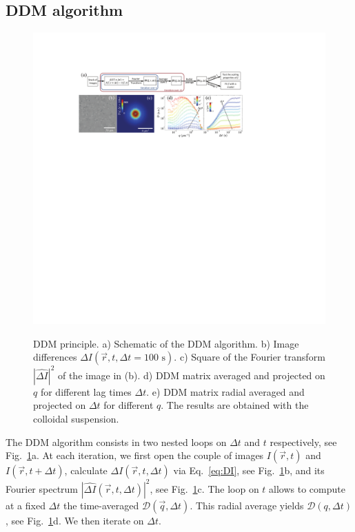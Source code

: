 \documentclass[prb,twocolumn,amsmath,amssymb]{revtex4-1}
\begin{document}
\subsection{DDM algorithm}
\label{sec:ddmalgo}

\begin{figure}
	\includegraphics[width=\linewidth]{Graph.pdf}\\
	\caption{DDM principle. a) Schematic of the DDM algorithm. b) Image differences $\Delta I(\vec{r}, t,\Delta t=100 \text{ s})$. c) Square of the Fourier transform $|\widehat{\Delta I}|^2$ of the image in  (b). d) DDM matrix averaged and projected on $q$ for different lag times $\Delta t$. e) DDM matrix radial averaged and projected on $\Delta t$ for different $q$.  The results are obtained with the colloidal suspension.}
	\label{fig:D}
\end{figure}

The DDM algorithm consists in two nested loops on $\Delta t$ and $t$ respectively, see Fig.~\ref{fig:D}a. At each iteration, we first open the couple of images $I(\vec{r},t)$ and $I(\vec{r},t+\Delta t)$, calculate $\Delta I(\vec{r},t, \Delta t)$ via Eq.~\eqref{eq:DI}, see Fig.~\ref{fig:D}b, and its Fourier spectrum $\left|\widehat{\Delta I}(\vec{r},t, \Delta t)\right|^2$, see Fig.~\ref{fig:D}c.  The loop on $t$ allows to compute at a fixed $\Delta t$ the time-averaged $\mathcal{D}(\vec{q}, \Delta t)$. This radial average yields $\mathcal{D}(q, \Delta t)$, see Fig.~\ref{fig:D}d. We then iterate on $\Delta t$.
\end{document}
